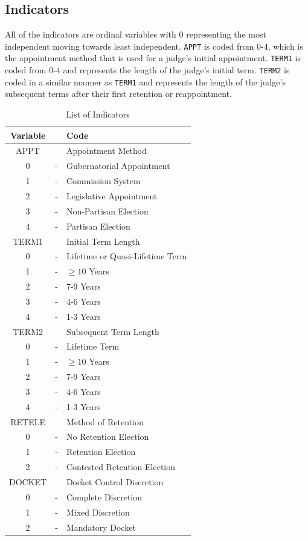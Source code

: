 \documentclass[12pt]{article}
\begin{document}
\subsection*{Indicators}
All of the indicators are ordinal variables with 0 representing the most independent moving towards least independent.  \texttt{APPT} is coded from 0-4, which is the appointment method that is used for a judge's initial appointment.  \texttt{TERM1} is coded from 0-4 and represents the length of the judge's initial term.  \texttt{TERM2} is coded in a similar manner as \texttt{TERM1} and represents the length of the judge's subsequent terms after their first retention or reappointment. 
\begin{table}[!htb]\singlespacing\centering
	\caption{List of Indicators}\label{Indicators}
	
	\begin{tabular}{ccl}\hline
		\textbf{Variable}	&		&	\textbf{Code}	\\\hline\hline
		APPT	&		&	Appointment Method	\\
		0	&	-	&	Gubernatorial Appointment	\\
		1	&	-	&	Commission System	\\
		2	&	-	&	Legislative Appointment	\\
		3	&	-	&	Non-Partisan Election	\\
		4	&	-	&	Partisan Election	\\\hline
		TERM1	&		&	Initial Term Length	\\
		0	&	-	&	Lifetime or Quasi-Lifetime Term\\
		1	&	-	&	$\geq10$ Years	\\
		2	&	-	&	7-9 Years	\\
		3	&	-	&	4-6 Years	\\
		4	&	-	&	1-3 Years	\\\hline
		TERM2	&		&	Subsequent Term Length	\\
		0	&	-	&	Lifetime Term	\\
		1   &   -   &   $\geq10$ Years \\
		2	&	-	&	7-9 Years	\\
		3	&	-	&	4-6 Years	\\
		4	&	-	&	1-3 Years	\\\hline
		RETELE	&		&	Method of Retention	\\
		0	&	-	&	No Retention Election	\\
		1	&	-	&	Retention Election	\\
		2	&	-	&	Contested Retention Election	\\\hline
		DOCKET	&		&	Docket Control Discretion	\\
		0	&	-	&	Complete Discretion	\\
		1	&	-	&	Mixed Discretion	\\
		2	&	-	&	Mandatory Docket	\\\hline
	\end{tabular}
	
\end{table}
\end{document}
